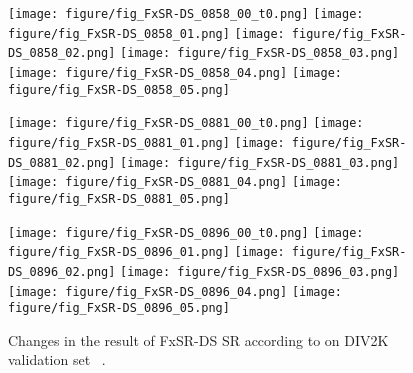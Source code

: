 \documentclass{article}
\begin{document}
\begin{figure*}[!t]
\begin{minipage}[t]{1.0\linewidth}
    \texttt{[image: figure/fig\_FxSR-DS\_0858\_00\_t0.png]}\hfill
    \texttt{[image: figure/fig\_FxSR-DS\_0858\_01.png]}\hfill
    \texttt{[image: figure/fig\_FxSR-DS\_0858\_02.png]}\hfill
    \texttt{[image: figure/fig\_FxSR-DS\_0858\_03.png]}\hfill
    \texttt{[image: figure/fig\_FxSR-DS\_0858\_04.png]}\hfill
    \texttt{[image: figure/fig\_FxSR-DS\_0858\_05.png]}\vfill
    \vspace{0.3cm}



    \texttt{[image: figure/fig\_FxSR-DS\_0881\_00\_t0.png]}\hfill
    \texttt{[image: figure/fig\_FxSR-DS\_0881\_01.png]}\hfill
    \texttt{[image: figure/fig\_FxSR-DS\_0881\_02.png]}\hfill
    \texttt{[image: figure/fig\_FxSR-DS\_0881\_03.png]}\hfill
    \texttt{[image: figure/fig\_FxSR-DS\_0881\_04.png]}\hfill
    \texttt{[image: figure/fig\_FxSR-DS\_0881\_05.png]}\vfill
    \vspace{0.3cm}



    \texttt{[image: figure/fig\_FxSR-DS\_0896\_00\_t0.png]}\hfill
    \texttt{[image: figure/fig\_FxSR-DS\_0896\_01.png]}\hfill
    \texttt{[image: figure/fig\_FxSR-DS\_0896\_02.png]}\hfill
    \texttt{[image: figure/fig\_FxSR-DS\_0896\_03.png]}\hfill
    \texttt{[image: figure/fig\_FxSR-DS\_0896\_04.png]}\hfill
    \texttt{[image: figure/fig\_FxSR-DS\_0896\_05.png]}\vfill
\end{minipage}
\caption{Changes in the result of FxSR-DS  SR according to  on DIV2K validation set~\cite{agustsson2017ntire} .}
\label{fig:fig_FxSR-DS_t}
\end{figure*}
\end{document}
